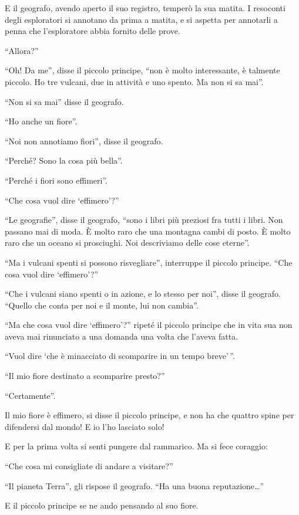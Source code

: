 \documentclass[11pt]{scrbook}
\begin{document}
E il geografo, avendo aperto il suo registro, temperò la sua matita. I resoconti degli esploratori si annotano da prima a matita, e si aspetta per annotarli a penna che l'esploratore abbia fornito delle prove.

``Allora?''

``Oh! Da me'', disse il piccolo principe, ``non è molto interessante, è talmente piccolo. Ho tre vulcani, due in attività e uno spento. Ma non si sa mai''.

``Non si sa mai'' disse il geografo.

``Ho anche un fiore''.

``Noi non annotiamo fiori'', disse il geografo.

``Perché? Sono la cosa più bella''.

``Perché i fiori sono effimeri''.

``Che cosa vuol dire `effimero'?''

``Le geografie'', disse il geografo, ``sono i libri più preziosi fra tutti i libri. Non passano mai di moda. È molto raro che una montagna cambi di posto. È molto raro che un oceano si prosciughi. Noi descriviamo delle cose eterne''.

``Ma i vulcani spenti si possono risvegliare'', interruppe il piccolo principe. ``Che cosa vuol dire `effimero'?''

``Che i vulcani siano spenti o in azione, e lo stesso per noi'', disse il geografo. ``Quello che conta per noi e il monte, lui non cambia''.

``Ma che cosa vuol dire `effimero'?'' ripeté il piccolo principe che in vita sua non aveva mai rinunciato a una domanda una volta che l'aveva fatta.

``Vuol dire `che è minacciato di scomparire in un tempo breve'\,''.

``Il mio fiore destinato a scomparire presto?''

``Certamente''.

Il mio fiore è effimero, si disse il piccolo principe, e non ha che
quattro spine per difendersi dal mondo! E io l'ho lasciato solo!

E per la prima volta si senti pungere dal rammarico. Ma si fece
coraggio:

``Che cosa mi consigliate di andare a visitare?''

``Il pianeta Terra'', gli rispose il geografo. ``Ha una buona
reputazione\ldots{}''

E il piccolo principe se ne ando pensando al suo fiore.
\end{document}
